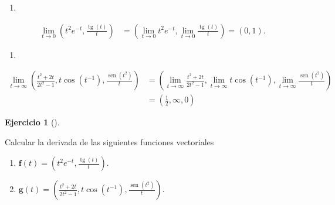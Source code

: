 \documentclass[
  spanish,
  a4paper,
]{scrreport}
\providecommand{\tightlist}{%
  \setlength{\itemsep}{0pt}\setlength{\parskip}{0pt}}
\theoremstyle{definition}
\newtheorem{exercise}{Ejercicio}[chapter]
\theoremstyle{remark}
\begin{document}
\begin{tcolorbox}[enhanced jigsaw, arc=.35mm, bottomrule=.15mm, bottomtitle=1mm, breakable, colback=white, colbacktitle=quarto-callout-tip-color!10!white, colframe=quarto-callout-tip-color-frame, coltitle=black, left=2mm, leftrule=.75mm, opacityback=0, opacitybacktitle=0.6, rightrule=.15mm, title=\textcolor{quarto-callout-tip-color}{\faLightbulb}\hspace{0.5em}{Solución}, titlerule=0mm, toprule=.15mm, toptitle=1mm]

\begin{enumerate}
\def\labelenumi{\alph{enumi}.}
\tightlist
\item
\end{enumerate}

\begin{align*}
\lim_{t\to 0} \left(t^2e^{-t}, \frac{\operatorname{tg}(t)}{t} \right) 
&= \left(\lim_{t\to 0} t^2e^{-t}, \lim_{t\to 0}\frac{\operatorname{tg}(t)}{t} \right)
= (0, 1).
\end{align*}

\begin{enumerate}
\def\labelenumi{\alph{enumi}.}
\setcounter{enumi}{1}
\tightlist
\item
\end{enumerate}

\begin{align*}
\lim_{t\to \infty} \left(\frac{t^2+2t}{2t^2-1}, t\cos(t^{-1}), \frac{\operatorname{sen}(t^2)}{t} \right)
&= \left(\lim_{t\to \infty} \frac{t^2+2t}{2t^2-1}, \lim_{t\to\infty} t\cos(t^{-1}), \lim_{t\to\infty} \frac{\operatorname{sen}(t^2)}{t} \right) \\
&= \left(\frac{1}{2}, \infty, 0\right)
\end{align*}

\end{tcolorbox}

\begin{exercise}[]\protect\hypertarget{exr-derivadas-funciones-vectoriales}{}\label{exr-derivadas-funciones-vectoriales}

Calcular la derivada de las siguientes funciones vectoriales

\begin{enumerate}
\def\labelenumi{\alph{enumi}.}
\item
  \(\displaystyle \mathbf{f}(t)=\left(t^2e^{-t}, \frac{\operatorname{tg}(t)}{t} \right)\).
\item
  \(\displaystyle \mathbf{g}(t)= \left(\frac{t^2+2t}{2t^2-1}, t\cos(t^{-1}), \frac{\operatorname{sen}(t^2)}{t} \right)\).
\end{enumerate}

\end{exercise}
\end{document}
